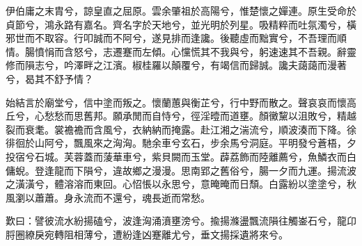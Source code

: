 
\begin{pinyinscope}
伊伯庸之末胄兮，諒皇直之屈原。雲余肇祖於高陽兮，惟楚懷之嬋連。原生受命於貞節兮，鴻永路有嘉名。齊名字於天地兮，並光明於列星。吸精粹而吐氛濁兮，橫邪世而不取容。行叩誠而不阿兮，遂見排而逢讒。後聽虛而黜實兮，不吾理而順情。腸憤悁而含怒兮，志遷蹇而左傾。心戃慌其不我與兮，躬速速其不吾親。辭靈修而隕志兮，吟澤畔之江濱。椒桂羅以顛覆兮，有竭信而歸誠。讒夫藹藹而漫著兮，曷其不舒予情？

始結言於廟堂兮，信中塗而叛之。懷蘭蕙與衡芷兮，行中野而散之。聲哀哀而懷高丘兮，心愁愁而思舊邦。願承閒而自恃兮，徑淫曀而道壅。顏黴黧以沮敗兮，精越裂而衰耄。裳襜襜而含風兮，衣納納而掩露。赴江湘之湍流兮，順波湊而下降。徐徘徊於山阿兮，飄風來之洶洶。馳余車兮玄石，步余馬兮洞庭。平明發兮蒼梧，夕投宿兮石城。芙蓉蓋而蔆華車兮，紫貝闕而玉堂。薜荔飾而陸離薦兮，魚鱗衣而白傭蜺。登逢龍而下隕兮，違故鄉之漫漫。思南郢之舊俗兮，腸一夕而九運。揚流波之潢潢兮，體溶溶而東回。心怊悵以永思兮，意晻晻而日頹。白露紛以塗塗兮，秋風瀏以蕭蕭。身永流而不還兮，魂長逝而常愁。

歎曰：譬彼流水紛揚磕兮，波逢洶涌濆壅滂兮。揄揚滌盪飄流隕往觸崟石兮，龍卬脟圈繚戾宛轉阻相薄兮，遭紛逢凶蹇離尤兮，垂文揚採遺將來兮。


\end{pinyinscope}